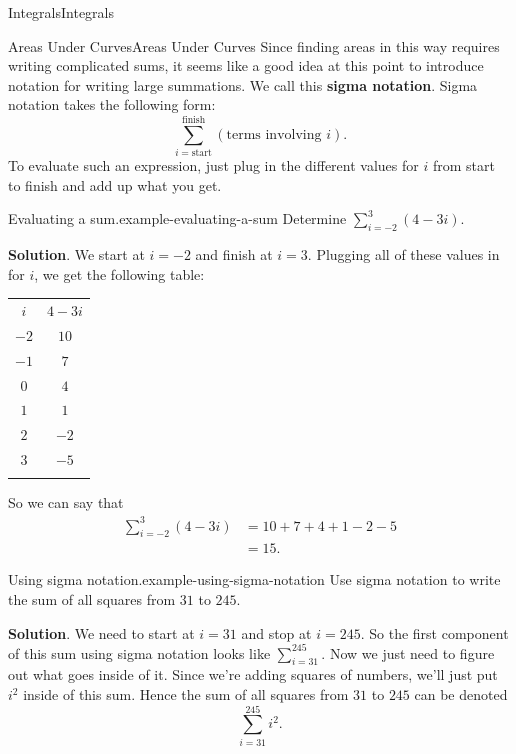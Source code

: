 \documentclass[10pt,]{book}
\newcommand{\terminology}[1]{\textbf{#1}}
\numberwithin{equation}{section}
\newcommand{\hrulethin}  {\noalign{\hrule height 0.04em}}
\newcommand{\hrulethick} {\noalign{\hrule height 0.11em}}
\begin{document}
\begin{chapterptx}{Integrals}{}{Integrals}{}{}
\begin{sectionptx}{Areas Under Curves}{}{Areas Under Curves}{}{}
\hypertarget{p-410}{}%
Since finding areas in this way requires writing complicated sums, it seems like a good idea at this point to introduce notation for writing large summations. We call this \terminology{sigma notation}. Sigma notation takes the following form:%
\begin{equation*}
\sum_{i=\text{start}}^{\text{finish}}(\text{terms involving }i).
\end{equation*}
To evaluate such an expression, just plug in the different values for \(i\) from start to finish and add up what you get.%
\begin{example}{Evaluating a sum.}{example-evaluating-a-sum}%
\hypertarget{p-411}{}%
Determine \(\sum_{i=-2}^{3}(4-3i).\)%
\par\smallskip%
\noindent\textbf{Solution}.\hypertarget{solution-90}{}\quad%
\hypertarget{p-412}{}%
We start at \(i=-2\) and finish at \(i=3\). Plugging all of these values in for \(i\), we get the following table: \begin{table}
\centering
\begin{tabular}{cc}\hrulethick
\(i\)&\(4-3i\)\tabularnewline\hrulethin
\(-2\)&\(10\)\tabularnewline[0pt]
\(-1\)&\(7\)\tabularnewline[0pt]
\(0\)&\(4\)\tabularnewline[0pt]
\(1\)&\(1\)\tabularnewline[0pt]
\(2\)&\(-2\)\tabularnewline[0pt]
\(3\)&\(-5\)\tabularnewline\hrulethick
\end{tabular}
\end{table}
 So we can say that%
\begin{align*}
\sum_{i=-2}^{3}(4-3i) & =  10 + 7 + 4 + 1 - 2 - 5\\
& = 15. 
\end{align*}
%
\end{example}
\begin{example}{Using sigma notation.}{example-using-sigma-notation}%
\hypertarget{p-413}{}%
Use sigma notation to write the sum of all squares from \(31\) to \(245\).%
\par\smallskip%
\noindent\textbf{Solution}.\hypertarget{solution-91}{}\quad%
\hypertarget{p-414}{}%
We need to start at \(i=31\) and stop at \(i=245\). So the first component of this sum using sigma notation looks like \(\sum_{i=31}^{245}\). Now we just need to figure out what goes inside of it. Since we're adding squares of numbers, we'll just put \(i^{2}\) inside of this sum. Hence the sum of all squares from \(31\) to \(245\) can be denoted%
\begin{equation*}
\sum_{i=31}^{245}i^{2}.
\end{equation*}
%
\end{example}

\end{sectionptx}
\end{chapterptx}
\end{document}
